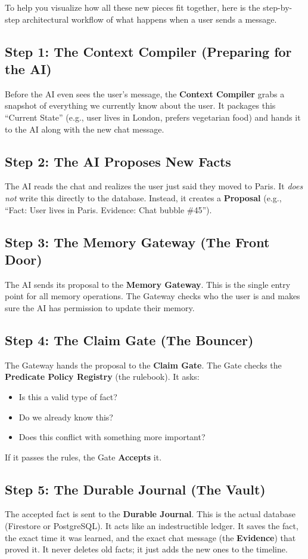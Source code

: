 \documentclass[12pt]{article}
\begin{document}
To help you visualize how all these new pieces fit together, here is the step-by-step architectural workflow of what happens when a user sends a message.

\subsection*{Step 1: The Context Compiler (Preparing for the AI)}
Before the AI even sees the user's message, the \textbf{Context Compiler} grabs a snapshot of everything we currently know about the user. It packages this ``Current State'' (e.g., user lives in London, prefers vegetarian food) and hands it to the AI along with the new chat message.

\subsection*{Step 2: The AI Proposes New Facts}
The AI reads the chat and realizes the user just said they moved to Paris. It \textit{does not} write this directly to the database. Instead, it creates a \textbf{Proposal} (e.g., ``Fact: User lives in Paris. Evidence: Chat bubble \#45'').

\subsection*{Step 3: The Memory Gateway (The Front Door)}
The AI sends its proposal to the \textbf{Memory Gateway}. This is the single entry point for all memory operations. The Gateway checks who the user is and makes sure the AI has permission to update their memory.

\subsection*{Step 4: The Claim Gate (The Bouncer)}
The Gateway hands the proposal to the \textbf{Claim Gate}. The Gate checks the \textbf{Predicate Policy Registry} (the rulebook). It asks: 
\begin{itemize}[noitemsep]
    \item Is this a valid type of fact?
    \item Do we already know this? 
    \item Does this conflict with something more important?
\end{itemize}
If it passes the rules, the Gate \textbf{Accepts} it.

\subsection*{Step 5: The Durable Journal (The Vault)}
The accepted fact is sent to the \textbf{Durable Journal}. This is the actual database (Firestore or PostgreSQL). It acts like an indestructible ledger. It saves the fact, the exact time it was learned, and the exact chat message (the \textbf{Evidence}) that proved it. It never deletes old facts; it just adds the new ones to the timeline.
\end{document}
